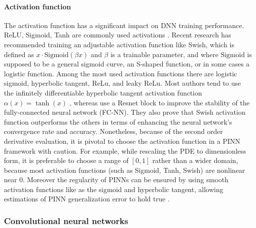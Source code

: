 \documentclass[pdflatex,sn-basic]{sn-jnl}%
\theoremstyle{thmstyleone}%
\theoremstyle{thmstyletwo}%
\theoremstyle{thmstylethree}%
\begin{document}
\paragraph{Activation function}
The activation function has a significant impact on DNN training performance.
ReLU, Sigmoid, Tanh are commonly used activations \citep{Sun2020_SurrogateModelingFluid_GaoSGPW}.
Recent research has recommended training an adjustable activation function like  Swish, which is defined as $x\cdot \textrm{Sigmoid}(\beta x)$ and $\beta$ is a trainable parameter, %
and where $\textrm{Sigmoid}$ is supposed to be a general sigmoid curve, an S-shaped function, or in some cases a logistic function. 
Among the most used activation functions there are logistic sigmoid, hyperbolic tangent, ReLu, and leaky ReLu.
Most authors tend to use the infinitely differentiable hyperbolic tangent activation function $\alpha(x) = \tanh(x)$ \citep{He2020_PhysicsInformedNeural_BarHBTT},
whereas \cite{Che2021_DeepLearningMethod_ZhaCZ} use a Resnet block to improve the stability of the fully-connected neural network (FC-NN).
They also prove that Swish activation function outperforms the others in terms of enhancing the neural network's convergence rate and accuracy. %
Nonetheless, because of the second order derivative evaluation, it is pivotal to choose the activation function in a PINN framework with caution. 
%
For example, while rescaling the PDE to dimensionless form, it is preferable to choose a range of $[0,1]$ rather than a wider domain, because most activation functions (such as Sigmoid, Tanh, Swish) are nonlinear near $0$. 
%
Moreover the regularity of PINNs can be ensured by using smooth activation functions like as the sigmoid and hyperbolic tangent, allowing estimations of PINN generalization error to hold true \citep{Mis2021_EstimatesGeneralizationError_MolMM}. 






\subsubsection{Convolutional neural networks}
\end{document}
